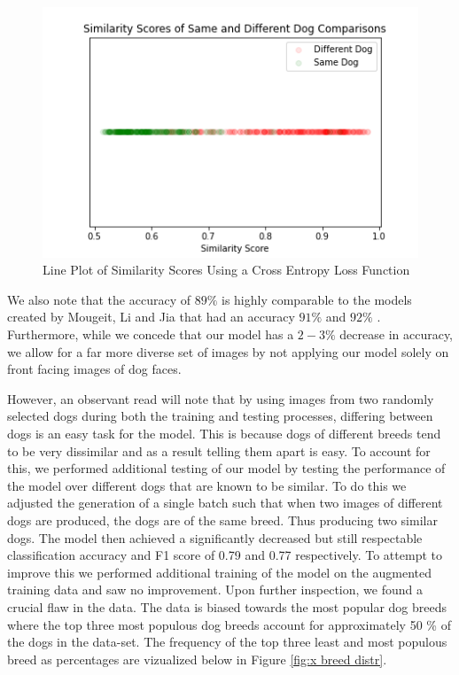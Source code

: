 \documentclass{article}
\begin{document}
\begin{enumerate}
\begin{figure}[h]
\centering
	\includegraphics[scale=0.7]{final-report-images/crossentropy_lineplot.png}
\caption{Line Plot of Similarity Scores Using a Cross Entropy Loss Function}
\label{fig:x triplet lineplot}
\end{figure}
\noident We also note that the accuracy of $89\%$ is highly comparable to the models created by Mougeit, Li and Jia that had an accuracy $91\%$ and $92\%$ \cite{MougeotGuillaume2019ADLA}.  Furthermore, while we concede that our model has a $2-3\%$ decrease in accuracy, we allow for a far more diverse set of images by not applying our model solely on front facing images of dog faces.

However, an observant read will note that by using images from two randomly selected dogs during both the training and testing processes, differing between dogs is an easy task for the model.  This is because dogs of different breeds tend to be very dissimilar and as a result telling them apart is easy.  To account for this, we performed additional testing of our model by testing the performance of the model over different dogs that are known to be similar.  To do this we adjusted the generation of a single batch such that when two images of different dogs are produced, the dogs are of the same breed.  Thus producing two similar dogs.  The model then achieved a significantly decreased but still respectable classification accuracy and F1 score of 0.79 and 0.77 respectively.   To attempt to improve this we performed additional training of the model on the augmented training data and saw no improvement.  Upon further inspection, we found a crucial flaw in the data.  The data is biased towards the most popular dog breeds where the top three most populous dog breeds account for approximately 50 \% of the dogs in the data-set.  The frequency of the top three least and most populous breed as percentages are vizualized below in Figure \ref{fig:x breed distr}.


\end{enumerate}
\end{document}
